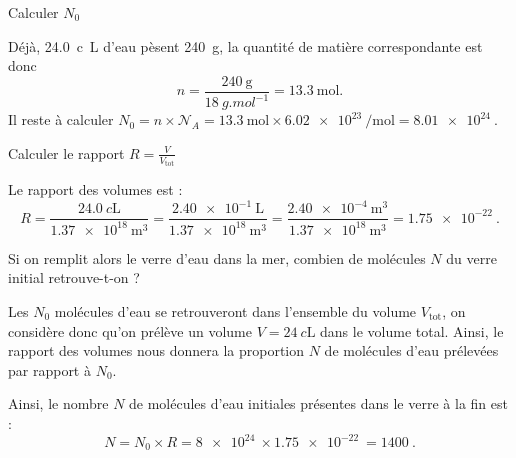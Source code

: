 
\begin{enonce}
Calculer $N_0$
\end{enonce}


\begin{corrige}
Déjà, \SI{24,0}{c\liter} d'eau pèsent \SI{240}{\gram}, la quantité de matière correspondante est donc 
\[
n=\frac{\SI{240}{\gram}}{\SI{18}{g.mol^{-1}}}=\SI{13,3}{\mol}.
\]
Il reste à calculer $N_0=n\times\mathcal{N}_A=\SI{13,3}{\mol}\times\SI{6,02e23}{\per\mol}=\SI{8,01e24}{}$.
\end{corrige}




\begin{enonce}
Calculer le rapport $R=\frac{V}{V_\text{tot}}$
\end{enonce}


\begin{corrige}
Le rapport des volumes est : 
\[
R=\frac{\SI{24,0}{c\liter}}{\SI{1,37e18}{\cubic\meter}}=\frac{\SI{2,40e-1}{\liter}}{\SI{1,37e18}{\cubic\meter}}=\frac{\SI{2,40e-4}{\cubic\meter}}{\SI{1,37e18}{\cubic\meter}}=\SI{1,75e-22}{}.
\]
\end{corrige}






\begin{enonce}
 Si on remplit alors le verre d’eau dans la mer, combien de molécules $N$ du verre initial retrouve-t-on ?

\end{enonce}


\begin{corrige}
Les $N_0$ molécules d'eau se retrouveront dans l'ensemble du volume $V_{\text{tot}}$, on considère donc qu'on prélève un volume $V=\SI{24}{c\liter}$ dans le volume total. Ainsi, le rapport des volumes nous donnera la proportion $N$ de molécules d'eau prélevées par rapport à $N_0$. 

Ainsi, le nombre $N$ de molécules d'eau initiales présentes dans le verre à la fin est : 
\[
N=N_0\times R=\SI{8e24}{}\times \SI{1,75e-22}{}
=\SI{1400}{}.
\]
\end{corrige}

